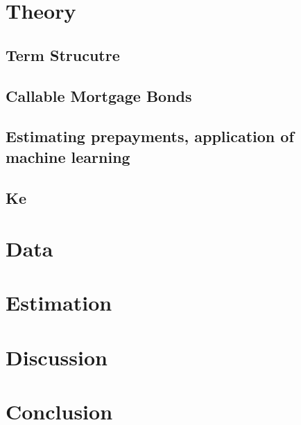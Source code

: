 \documentclass[12pt,twoside]{reedthesis}
\begin{document}
\hypertarget{theory}{%
\chapter{Theory}\label{theory}}

\hypertarget{term-strucutre}{%
\section{Term Strucutre}\label{term-strucutre}}

\hypertarget{callable-mortgage-bonds}{%
\section{Callable Mortgage Bonds}\label{callable-mortgage-bonds}}

\hypertarget{estimating-prepayments-application-of-machine-learning}{%
\section{Estimating prepayments, application of machine learning}\label{estimating-prepayments-application-of-machine-learning}}

\hypertarget{ke}{%
\section{Ke}\label{ke}}

\hypertarget{data}{%
\chapter{Data}\label{data}}

\hypertarget{estimation}{%
\chapter{Estimation}\label{estimation}}

\hypertarget{discussion}{%
\chapter*{Discussion}\label{discussion}}

\hypertarget{conclusion}{%
\chapter*{Conclusion}\label{conclusion}}
\end{document}
